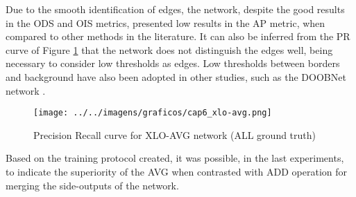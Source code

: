 
Due to the smooth identification of edges, the network, despite the good results in the ODS and OIS metrics, presented low results in the AP metric, when compared to other methods in the literature.
It can also be inferred from the PR curve of Figure \ref{fig:bsds_xlo_avg_curve} that the network does not distinguish the edges well, being necessary to consider low thresholds as edges. 
Low thresholds between borders and background have also been adopted in other studies, such as the DOOBNet network \cite{Cumulative:Song20181847}.

\begin{figure}%
  \centering
  \caption{Precision Recall curve for XLO-AVG network (ALL ground truth)}
  \texttt{[image: ../../imagens/graficos/cap6\_xlo-avg.png]}
  \sourceOwn
  \label{fig:bsds_xlo_avg_curve}
\end{figure}


Based on the training protocol created, it was possible, in the last experiments, to indicate the superiority of the AVG when contrasted with ADD operation for merging the side-outputs of the network.


